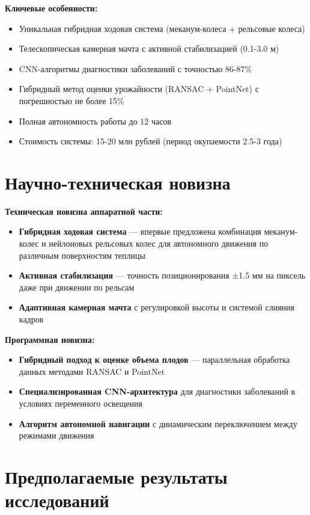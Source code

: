 \documentclass[12pt,a4paper]{article}
\begin{document}
\textbf{Ключевые особенности:}
\begin{itemize}
    \item Уникальная гибридная ходовая система (меканум-колеса + рельсовые колеса)
    \item Телескопическая камерная мачта с активной стабилизацией (0.1-3.0 м)
    \item CNN-алгоритмы диагностики заболеваний с точностью 86-87\%
    \item Гибридный метод оценки урожайности (RANSAC + PointNet) с погрешностью не более 15\%
    \item Полная автономность работы до 12 часов
    \item Стоимость системы: 15-20 млн рублей (период окупаемости 2.5-3 года)
\end{itemize}

\section{Научно-техническая новизна}

\textbf{Техническая новизна аппаратной части:}
\begin{itemize}
    \item \textbf{Гибридная ходовая система} — впервые предложена комбинация меканум-колес и нейлоновых рельсовых колес для автономного движения по различным поверхностям теплицы
    \item \textbf{Активная стабилизация} — точность позиционирования ±1.5 мм на пиксель даже при движении по рельсам
    \item \textbf{Адаптивная камерная мачта} с регулировкой высоты и системой слияния кадров
\end{itemize}

\textbf{Программная новизна:}
\begin{itemize}
    \item \textbf{Гибридный подход к оценке объема плодов} — параллельная обработка данных методами RANSAC и PointNet
    \item \textbf{Специализированная CNN-архитектура} для диагностики заболеваний в условиях переменного освещения
    \item \textbf{Алгоритм автономной навигации} с динамическим переключением между режимами движения
\end{itemize}

\section{Предполагаемые результаты исследований}
\end{document}

